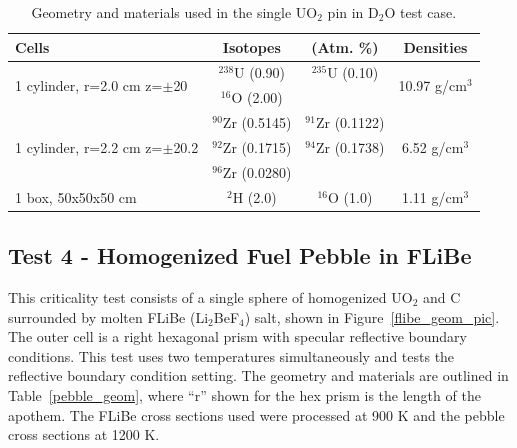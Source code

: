 \documentclass[preprint,12pt]{elsarticle}
\begin{document}
\begin{table}[h]
\centering
\caption{Geometry and materials used in the single UO$_2$ pin in D$_2$O test case.}
\label{uo2_pincell_geom}
\begin{tabular}{| l | c  c | c |}
\hline
Cells & Isotopes & (Atm. \%)& Densities \\
\hline
\multirow{2}{*}{1 cylinder, r=2.0 cm z=$\pm$20 }  &   $^{238}$U   (0.90) &  $^{235}$U   (0.10) &  \multirow{2}{*}{10.97 g/cm$^3$} \\
                                                                              &   $^{16}$O    (2.00)  &                              &  \\
\hline
\multirow{3}{*}{1 cylinder, r=2.2 cm z=$\pm$20.2}  &   $^{90}$Zr   (0.5145) &  $^{91}$Zr   (0.1122)&  \multirow{3}{*}{6.52 g/cm$^3$} \\
                                                   &   $^{92}$Zr   (0.1715) &  $^{94}$Zr   (0.1738)& \\
                                                   &   $^{96}$Zr   (0.0280) &                      & \\
\hline
\multirow{1}{*}{1 box, 50x50x50 cm }  &    $^{2}$H   (2.0) & $^{16}$O   (1.0) &   \multirow{1}{*}{1.11 g/cm$^3$} \\
\hline
\end{tabular}
\end{table}



\newpage
\subsection{Test 4 - Homogenized Fuel Pebble in FLiBe}

This criticality test consists of a single sphere of homogenized UO$_2$ and C surrounded by molten FLiBe (Li$_2$BeF$_4$) salt, shown in Figure~\ref{flibe_geom_pic}.  The outer cell is a right hexagonal prism with specular reflective boundary conditions.  This test uses two temperatures simultaneously and tests the reflective boundary condition setting.  The geometry and materials are outlined in Table~\ref{pebble_geom}, where ``r'' shown for the hex prism is the length of the apothem.  The FLiBe cross sections used were processed at 900 K and the pebble cross sections at 1200 K.
\end{document}
